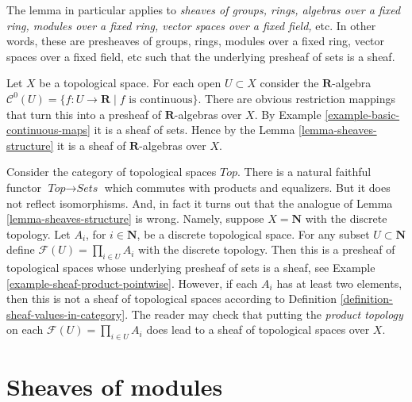 \noindent
The lemma in particular applies to
{\it sheaves of groups, rings, algebras over a fixed ring, modules
over a fixed ring, vector spaces over a fixed field, } etc.
In other words, these are presheaves of groups, rings,
modules over a fixed ring, vector spaces over a fixed field, etc
such that the underlying presheaf of sets is a sheaf.

\begin{example}
\label{example-C0-sheaf-rings}
Let $X$ be a topological space. For each open $U \subset X$ consider
the $\mathbf{R}$-algebra
$\mathcal{C}^{0}(U) = \{ f : U \to \mathbf{R} \mid f\text{ is continuous}\}$.
There are obvious restriction mappings that turn this into a
presheaf of $\mathbf{R}$-algebras over $X$.
By Example \ref{example-basic-continuous-maps} it is a sheaf of sets.
Hence by the Lemma \ref{lemma-sheaves-structure} it is a sheaf of
$\mathbf{R}$-algebras over $X$.
\end{example}

\begin{example}
\label{example-sheaves-topological-spaces}
Consider the category of topological spaces $\textit{Top}$.
There is a natural faithful functor $\textit{Top} \to \textit{Sets}$
which commutes with products and equalizers. But it does
not reflect isomorphisms. And, in fact it turns out that
the analogue of Lemma \ref{lemma-sheaves-structure} is wrong.
Namely, suppose $X = \mathbf{N}$ with the discrete
topology. Let $A_i$, for $i \in \mathbf{N}$, be a discrete
topological space. For any subset $U \subset \mathbf{N}$
define $\mathcal{F}(U) = \prod_{i\in U} A_i$ with the
discrete topology. Then this is a presheaf of topological
spaces whose underlying presheaf of sets is a sheaf, see
Example \ref{example-sheaf-product-pointwise}.
However, if each $A_i$ has at least two elements, then
this is not a sheaf of topological spaces
according to Definition \ref{definition-sheaf-values-in-category}.
The reader may check that putting the {\it product topology} on
each $\mathcal{F}(U) = \prod_{i\in U} A_i$ does lead to a sheaf
of topological spaces over $X$.
\end{example}


\section{Sheaves of modules}
\label{section-sheaves-modules}


